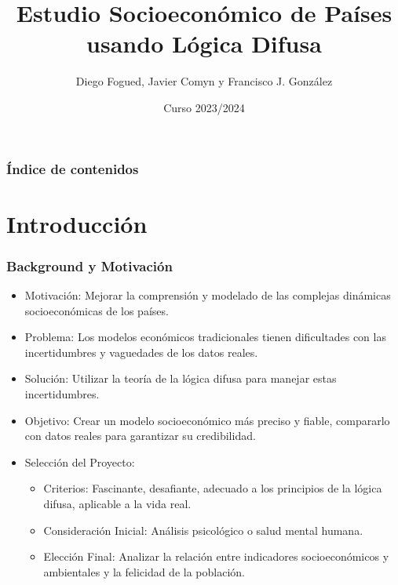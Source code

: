 \documentclass{beamer}
\title{Estudio Socioeconómico de Países usando Lógica Difusa}
\author{Diego Fogued, Javier Comyn y Francisco J. González}
\institute{Universidad Politécnica de Madrid}
\date{Curso 2023/2024}
\newcommand{\slideauthor}[1]{\gdef\insertslideauthor{#1}}
\begin{document}
\frame{\titlepage}

\begin{frame}
\frametitle{Índice de contenidos}
\tableofcontents
\end{frame}

\section{Introducción}
\begin{frame}
\frametitle{Background y Motivación}
\slideauthor{Diego Fogued}
\begin{itemize}
    \item Motivación: Mejorar la comprensión y modelado de las complejas dinámicas socioeconómicas de los países.
    \item Problema: Los modelos económicos tradicionales tienen dificultades con las incertidumbres y vaguedades de los datos reales.
    \item Solución: Utilizar la teoría de la lógica difusa para manejar estas incertidumbres.
    \item Objetivo: Crear un modelo socioeconómico más preciso y fiable, compararlo con datos reales para garantizar su credibilidad.
    \item Selección del Proyecto:
    \begin{itemize}
        \item Criterios: Fascinante, desafiante, adecuado a los principios de la lógica difusa, aplicable a la vida real.
        \item Consideración Inicial: Análisis psicológico o salud mental humana.
        \item Elección Final: Analizar la relación entre indicadores socioeconómicos y ambientales y la felicidad de la población.
    \end{itemize}
\end{itemize}

\end{frame}
\end{document}
